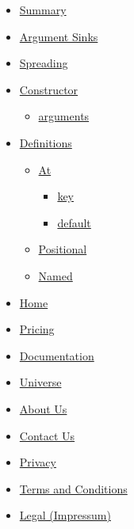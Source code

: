 \begin{itemize}
\tightlist
\item
  \hyperref[summary]{Summary}
\item
  \hyperref[argument-sinks]{Argument Sinks}
\item
  \hyperref[spreading]{Spreading}
\item
  \hyperref[constructor]{Constructor}

  \begin{itemize}
  \tightlist
  \item
    \hyperref[constructor-arguments]{arguments}
  \end{itemize}
\item
  \hyperref[definitions]{Definitions}

  \begin{itemize}
  \tightlist
  \item
    \hyperref[definitions-at]{At}

    \begin{itemize}
    \tightlist
    \item
      \hyperref[definitions-at-key]{key}
    \item
      \hyperref[definitions-at-default]{default}
    \end{itemize}
  \item
    \hyperref[definitions-pos]{Positional}
  \item
    \hyperref[definitions-named]{Named}
  \end{itemize}
\end{itemize}

\begin{itemize}
\tightlist
\item
  \href{/}{Home}
\item
  \href{/pricing/}{Pricing}
\item
  \href{/docs/}{Documentation}
\item
  \href{/universe/}{Universe}
\item
  \href{/about/}{About Us}
\item
  \href{/contact/}{Contact Us}
\item
  \href{/privacy/}{Privacy}
\item
  \href{https://typst.app/terms}{Terms and Conditions}
\item
  \href{/legal/}{Legal (Impressum)}
\end{itemize}


